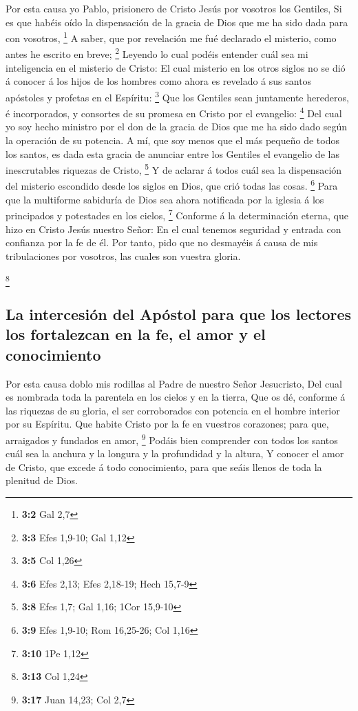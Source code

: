  Por esta causa yo Pablo, prisionero de Cristo Jesús por
vosotros los Gentiles,  Si es que habéis oído la
dispensación de la gracia de Dios que me ha sido dada para con vosotros,
\footnote{\textbf{3:2} Gal 2,7}  A saber, que por revelación
me fué declarado el misterio, como antes he escrito en breve;
\footnote{\textbf{3:3} Efes 1,9-10; Gal 1,12}  Leyendo lo
cual podéis entender cuál sea mi inteligencia en el misterio de Cristo:
 El cual misterio en los otros siglos no se dió á conocer á
los hijos de los hombres como ahora es revelado á sus santos apóstoles y
profetas en el Espíritu: \footnote{\textbf{3:5} Col 1,26} 
Que los Gentiles sean juntamente herederos, é incorporados, y consortes
de su promesa en Cristo por el evangelio: \footnote{\textbf{3:6} Efes
  2,13; Efes 2,18-19; Hech 15,7-9}  Del cual yo soy hecho
ministro por el don de la gracia de Dios que me ha sido dado según la
operación de su potencia.  A mí, que soy menos que el más
pequeño de todos los santos, es dada esta gracia de anunciar entre los
Gentiles el evangelio de las inescrutables riquezas de Cristo,
\footnote{\textbf{3:8} Efes 1,7; Gal 1,16; 1Cor 15,9-10}  Y
de aclarar á todos cuál sea la dispensación del misterio escondido desde
los siglos en Dios, que crió todas las cosas. \footnote{\textbf{3:9}
  Efes 1,9-10; Rom 16,25-26; Col 1,16}  Para que la
multiforme sabiduría de Dios sea ahora notificada por la iglesia á los
principados y potestades en los cielos, \footnote{\textbf{3:10} 1Pe 1,12}
 Conforme á la determinación eterna, que hizo en Cristo
Jesús nuestro Señor:  En el cual tenemos seguridad y
entrada con confianza por la fe de él.  Por tanto, pido que
no desmayéis á causa de mis tribulaciones por vosotros, las cuales son
vuestra gloria.

\footnote{\textbf{3:13} Col 1,24}

\hypertarget{la-intercesiuxf3n-del-apuxf3stol-para-que-los-lectores-los-fortalezcan-en-la-fe-el-amor-y-el-conocimiento}{%
\subsection{La intercesión del Apóstol para que los lectores los
fortalezcan en la fe, el amor y el
conocimiento}\label{la-intercesiuxf3n-del-apuxf3stol-para-que-los-lectores-los-fortalezcan-en-la-fe-el-amor-y-el-conocimiento}}

 Por esta causa doblo mis rodillas al Padre de nuestro
Señor Jesucristo,  Del cual es nombrada toda la parentela
en los cielos y en la tierra,  Que os dé, conforme á las
riquezas de su gloria, el ser corroborados con potencia en el hombre
interior por su Espíritu.  Que habite Cristo por la fe en
vuestros corazones; para que, arraigados y fundados en amor, \footnote{\textbf{3:17}
  Juan 14,23; Col 2,7}  Podáis bien comprender con todos
los santos cuál sea la anchura y la longura y la profundidad y la
altura,  Y conocer el amor de Cristo, que excede á todo
conocimiento, para que seáis llenos de toda la plenitud de Dios.

